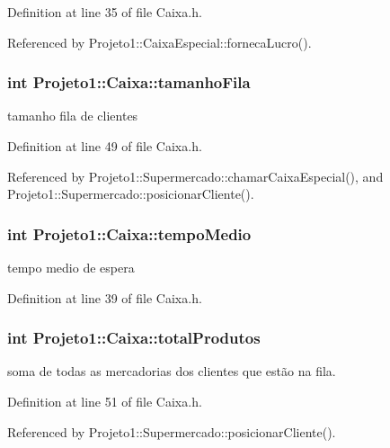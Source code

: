 Definition at line 35 of file Caixa.h.



Referenced by Projeto1::CaixaEspecial::fornecaLucro().

\hypertarget{classProjeto1_1_1Caixa_a6a968db0d50c39f1429591190ad34791}{
\subsubsection[{tamanhoFila}]{\setlength{\rightskip}{0pt plus 5cm}int {\bf Projeto1::Caixa::tamanhoFila}}}
\label{classProjeto1_1_1Caixa_a6a968db0d50c39f1429591190ad34791}
tamanho fila de clientes 

Definition at line 49 of file Caixa.h.



Referenced by Projeto1::Supermercado::chamarCaixaEspecial(), and Projeto1::Supermercado::posicionarCliente().

\hypertarget{classProjeto1_1_1Caixa_a2a7071befa8bd345aae8bc42b9d08e24}{
\subsubsection[{tempoMedio}]{\setlength{\rightskip}{0pt plus 5cm}int {\bf Projeto1::Caixa::tempoMedio}}}
\label{classProjeto1_1_1Caixa_a2a7071befa8bd345aae8bc42b9d08e24}
tempo medio de espera 

Definition at line 39 of file Caixa.h.

\hypertarget{classProjeto1_1_1Caixa_ab02cf6a92e30a62022a04335742f2767}{
\subsubsection[{totalProdutos}]{\setlength{\rightskip}{0pt plus 5cm}int {\bf Projeto1::Caixa::totalProdutos}}}
\label{classProjeto1_1_1Caixa_ab02cf6a92e30a62022a04335742f2767}
soma de todas as mercadorias dos clientes que estão na fila. 

Definition at line 51 of file Caixa.h.



Referenced by Projeto1::Supermercado::posicionarCliente().

